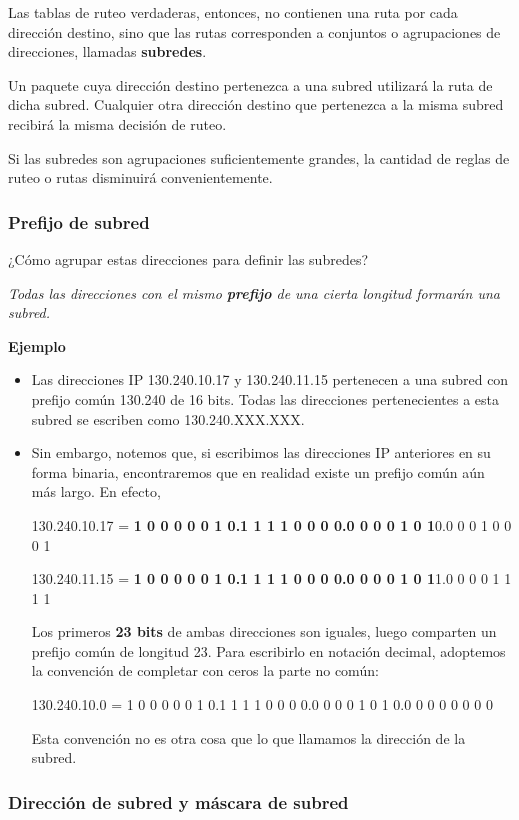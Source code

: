 \documentclass[spanish,A4,]{article}
\begin{document}
Las tablas de ruteo verdaderas, entonces, no contienen una ruta por cada
dirección destino, sino que las rutas corresponden a conjuntos o
agrupaciones de direcciones, llamadas \textbf{subredes}.

Un paquete cuya dirección destino pertenezca a una subred utilizará la
ruta de dicha subred. Cualquier otra dirección destino que pertenezca a
la misma subred recibirá la misma decisión de ruteo.

Si las subredes son agrupaciones suficientemente grandes, la cantidad de
reglas de ruteo o rutas disminuirá convenientemente.

\subsubsection{Prefijo de subred}\label{prefijo-de-subred}

¿Cómo agrupar estas direcciones para definir las subredes?

\emph{Todas las direcciones con el mismo \textbf{prefijo} de una cierta
longitud formarán una subred.}

\textbf{Ejemplo}

\begin{itemize}
\item
  Las direcciones IP 130.240.10.17 y 130.240.11.15 pertenecen a una
  subred con prefijo común 130.240 de 16 bits. Todas las direcciones
  pertenecientes a esta subred se escriben como 130.240.XXX.XXX.
\item
  Sin embargo, notemos que, si escribimos las direcciones IP anteriores
  en su forma binaria, encontraremos que en realidad existe un prefijo
  común aún más largo. En efecto,

  130.240.10.17 = \textbf{1 0 0 0 0 0 1 0.1 1 1 1 0 0 0 0.0 0 0 0 1 0 1}0.0 0 0 1 0 0 0 1

  130.240.11.15 = \textbf{1 0 0 0 0 0 1 0.1 1 1 1 0 0 0 0.0 0 0 0 1 0 1}1.0 0 0 0 1 1 1 1

  Los primeros \textbf{23 bits} de ambas direcciones son iguales, luego
  comparten un prefijo común de longitud 23. Para escribirlo en notación
  decimal, adoptemos la convención de completar con ceros la parte no
  común:

  130.240.10.0 = 1 0 0 0 0 0 1 0.1 1 1 1 0 0 0 0.0 0 0 0 1 0 1 0.0 0 0 0 0 0 0 0

  Esta convención no es otra cosa que lo que llamamos la dirección de la
  subred.
\end{itemize}

\subsubsection{Dirección de subred y máscara de
subred}\label{direcciuxf3n-de-subred-y-muxe1scara-de-subred}
\end{document}
